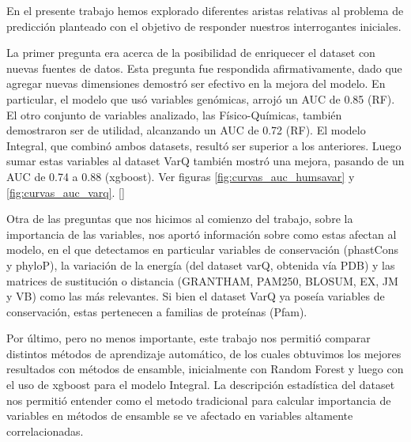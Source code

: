 En el presente trabajo hemos explorado diferentes aristas relativas al problema de predicción planteado con el objetivo de responder nuestros interrogantes iniciales. 

    

La primer pregunta era acerca de la posibilidad de enriquecer el dataset con nuevas fuentes de datos. Esta pregunta fue respondida afirmativamente, dado que agregar nuevas dimensiones demostró ser efectivo en la mejora del modelo. 
En particular, el modelo que usó variables genómicas, arrojó un AUC de 0.85 (RF). El otro conjunto de variables analizado, las Físico-Químicas, también demostraron ser de utilidad, alcanzando un AUC de 0.72 (RF). El modelo Integral, que combinó ambos datasets, resultó ser superior a los anteriores. Luego sumar estas variables al dataset VarQ también mostró una mejora, pasando de un AUC de 0.74 a 0.88 (xgboost). Ver figuras \ref{fig:curvas_auc_humsavar} y \ref{fig:curvas_auc_varq}. []

Otra de las preguntas que nos hicimos al comienzo del trabajo, sobre la importancia de las variables, nos aportó información sobre como estas afectan al modelo, en el que detectamos en particular variables de conservación (phastCons y phyloP), la variación de la energía (del dataset varQ, obtenida vía PDB) y las matrices de sustitución o distancia (GRANTHAM, PAM250, BLOSUM, EX, JM y VB) como las más relevantes. Si bien el dataset VarQ ya poseía variables de conservación, estas pertenecen a familias de proteínas (Pfam).

Por último, pero no menos importante, este trabajo nos permitió comparar distintos métodos de aprendizaje automático, de los cuales obtuvimos los mejores resultados con métodos de ensamble, inicialmente con Random Forest y luego con el uso de xgboost para el modelo Integral. La descripción estadística del dataset nos permitió entender como el metodo tradicional para calcular importancia de variables en métodos de ensamble se ve afectado en variables altamente correlacionadas.  

